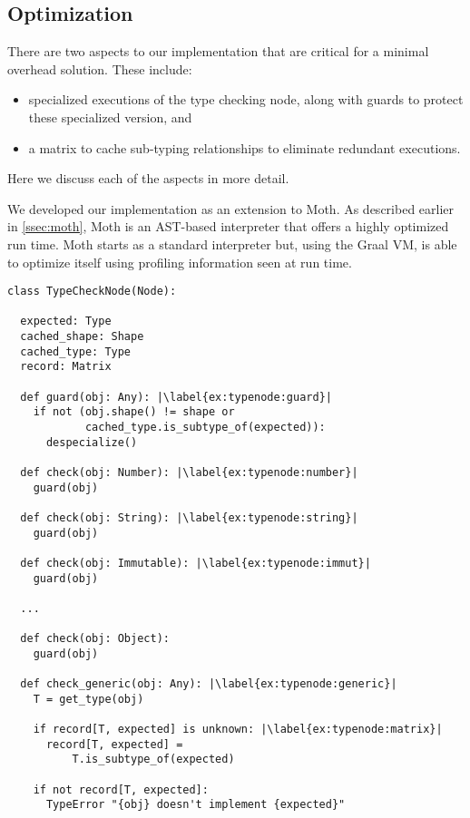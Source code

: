 \subsection{Optimization}
\label{ssec:optimization}

There are two aspects to our implementation that are critical for a minimal overhead solution. These include:

\begin{itemize}
  \item specialized executions of the type checking node, along with guards to protect these specialized version, and
  \item a matrix to cache sub-typing relationships to eliminate redundant executions.
\end{itemize}

Here we discuss each of the aspects in more detail.

We developed our implementation as an extension to Moth.
As described earlier in \cref{ssec:moth},
Moth is an AST-based interpreter that offers a highly optimized run time.
Moth starts as a standard interpreter but,
using the Graal VM,
is able to optimize itself using profiling information seen at run time. 

\begin{lstlisting}[label={ex:typenode},escapechar=|,caption={An illustration of the type checking node that support type checking},float,floatplacement=htbp]
class TypeCheckNode(Node):

  expected: Type
  cached_shape: Shape
  cached_type: Type
  record: Matrix
  
  def guard(obj: Any): |\label{ex:typenode:guard}|
    if not (obj.shape() != shape or
            cached_type.is_subtype_of(expected)):
      despecialize()

  def check(obj: Number): |\label{ex:typenode:number}|
    guard(obj)

  def check(obj: String): |\label{ex:typenode:string}|
    guard(obj)

  def check(obj: Immutable): |\label{ex:typenode:immut}|
    guard(obj)

  ...

  def check(obj: Object):
    guard(obj)
  
  def check_generic(obj: Any): |\label{ex:typenode:generic}|
    T = get_type(obj)
    
    if record[T, expected] is unknown: |\label{ex:typenode:matrix}|
      record[T, expected] =
          T.is_subtype_of(expected)

    if not record[T, expected]:
      TypeError "{obj} doesn't implement {expected}"
\end{lstlisting}

